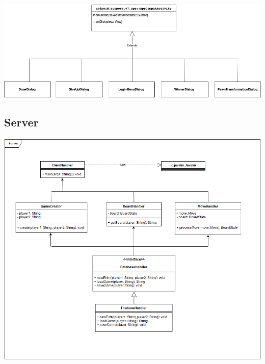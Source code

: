 \documentclass[parskip=full]{scrartcl}
\begin{document}
	
		\begin{minipage}{\linewidth}
			\centering
			\includegraphics[width=1\linewidth]{Diagramme/DialogDiagram}
			\label{fig:dialoge}
		\end{minipage}
		\newpage
		\subsection{Server}
		\begin{minipage}{\linewidth}
			\centering
			\includegraphics[width=1\linewidth]{Diagramme/Server}
			\label{fig:server}
		\end{minipage}
\end{document}

